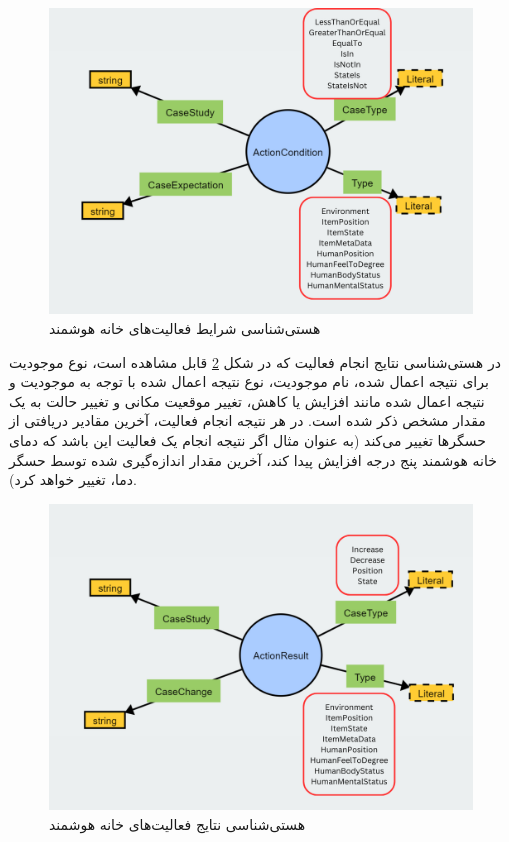 \begin{itemize}
\begin{figure}[htp]
\centerline{\includegraphics[width=1\textwidth]{figs/f406.png}}
\caption{هستی‌شناسی شرایط فعالیت‌های خانه هوشمند}
\label{fig:f406}
\end{figure}

در هستی‌شناسی نتایج انجام فعالیت که در شکل \ref{fig:f407} قابل مشاهده است، نوع موجودیت برای نتیجه اعمال شده، نام موجودیت، نوع نتیجه اعمال شده با توجه به موجودیت و نتیجه اعمال شده مانند افزایش یا کاهش، تغییر موقعیت مکانی و تغییر حالت به یک مقدار مشخص ذکر شده است. در هر نتیجه انجام فعالیت، آخرین مقادیر دریافتی از حسگرها تغییر می‌کند (به عنوان مثال اگر نتیجه انجام یک فعالیت این باشد که دمای خانه هوشمند پنج درجه افزایش پیدا کند، آخرین مقدار اندازه‌گیری شده توسط حسگر دما، تغییر خواهد کرد).

\begin{figure}[htp]
\centerline{\includegraphics[width=1\textwidth]{figs/f407.png}}
\caption{هستی‌شناسی نتایج فعالیت‌های خانه هوشمند}
\label{fig:f407}
\end{figure}


\end{itemize}
